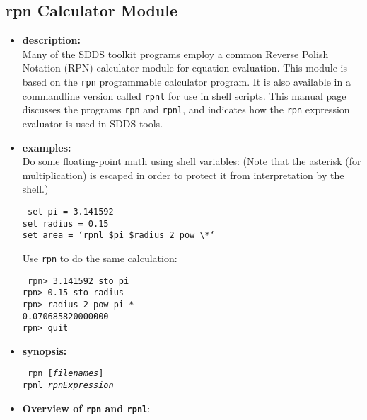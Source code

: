 \begin{latexonly}
\newpage
\end{latexonly}
\subsection{rpn Calculator Module}
\label{rpn}
\label{rpn Calculator Module}

\begin{itemize}
\item {\bf description:} \hspace*{1mm}\\

Many of the SDDS toolkit programs employ a common Reverse Polish Notation (RPN) calculator module for equation evaluation.
This module is based on the {\tt rpn} programmable calculator program.  It is also available in a commandline
version called {\tt rpnl} for use in shell scripts.  This manual page discusses the programs {\tt rpn} and 
{\tt rpnl},  and indicates how the {\tt rpn} expression evaluator is used in SDDS tools.
\item {\bf examples:} \\
Do some floating-point math using shell variables:
(Note that the asterisk (for multiplication) is escaped in order to protect it from interpretation by the shell.)
\begin{flushleft}{\tt
set pi = 3.141592\\
set radius = 0.15\\
set area = `rpnl \$pi \$radius 2 pow \verb|\|*`\\
}\end{flushleft}
Use {\tt rpn} to do the same calculation:
\begin{flushleft}{\tt
rpn> 3.141592 sto pi\\
rpn> 0.15 sto radius\\
rpn> radius 2 pow pi *\\
	      0.070685820000000\\
rpn> quit\\
}\end{flushleft}
\item {\bf synopsis:}
\begin{flushleft}{\tt
rpn [{\em filenames}]\\
rpnl {\em rpnExpression}
}\end{flushleft}
\item {\bf Overview of {\tt rpn} and {\tt rpnl}}:


\end{itemize}

